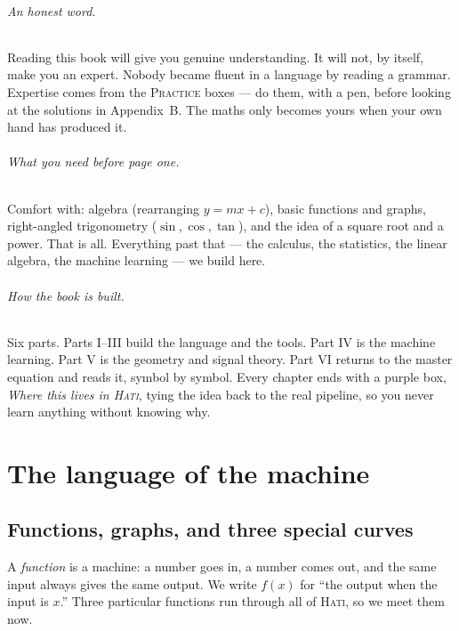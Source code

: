 \documentclass[11pt,oneside]{book}
\begin{document}
\paragraph{An honest word.} Reading this book will give you genuine understanding.
It will not, by itself, make you an expert. Nobody became fluent in a language by
reading a grammar. Expertise comes from the \textsc{Practice} boxes --- do them, with
a pen, before looking at the solutions in Appendix~B. The maths only becomes yours
when your own hand has produced it.

\paragraph{What you need before page one.} Comfort with: algebra (rearranging
$y=mx+c$), basic functions and graphs, right-angled trigonometry ($\sin,\cos,\tan$),
and the idea of a square root and a power. That is all. Everything past that --- the
calculus, the statistics, the linear algebra, the machine learning --- we build here.

\paragraph{How the book is built.} Six parts. Parts I--III build the language and the
tools. Part IV is the machine learning. Part V is the geometry and signal theory.
Part VI returns to the master equation and reads it, symbol by symbol. Every chapter
ends with a purple box, \emph{Where this lives in \textsc{Hati}}, tying the idea back
to the real pipeline, so you never learn anything without knowing why.

\mainmatter

\part{The language of the machine}

\chapter{Functions, graphs, and three special curves}

A \emph{function} is a machine: a number goes in, a number comes out, and the same
input always gives the same output. We write $f(x)$ for ``the output when the input is
$x$.'' Three particular functions run through all of \textsc{Hati}, so we meet them now.
\end{document}
